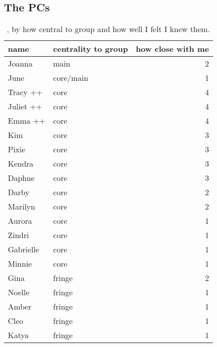\pagebreak

\subsection {The PCs}
\nopagebreak
\begin{table}[ht]
\caption{, by how central to group and how well I felt I knew them.}\label{PCnames}
	\centering
		\begin{tabular}{llr} \\
		\hline
		
			name & centrality to group & how close with me  \\
			\hline
			
			Joanna		&		main		&		2  \\
			June			&		core/main &  1 \\
			Tracy ++			&		core		&		4 \\
			Juliet ++	&   core		&		4 \\
			Emma ++		&		core		&		4 \\
			Kim				&		core		&		3 \\
			Pixie			&		core		&		3 \\
			Kendra		&		core		&		3 \\
			Daphne		&		core		&		3 \\
			Darby   	&		core		&		2 \\
			Marilyn 	&		core		&		2 \\
			Aurora		&		core		&		1 \\
			Zindri		&		core		&		1 \\
			Gabrielle	&		core		&		1 \\
			Minnie		&		core		&		1 \\
			Gina			&		fringe	&		2 \\
			Noelle		&		fringe	&		1 \\
			Amber   	&   fringe	&		1 \\
			Cleo			&		fringe	&		1 \\
			Katya			&		fringe	&		1 \\		
			
			   \hline
		\end{tabular}
\end{table}


\pagebreak

